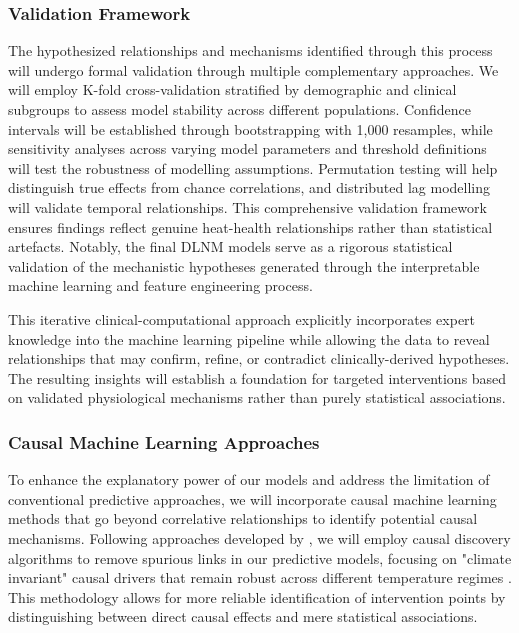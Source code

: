 \subsubsection{Validation Framework}
The hypothesized relationships and mechanisms identified through this process will undergo formal validation through multiple complementary approaches. We will employ K-fold cross-validation stratified by demographic and clinical subgroups to assess model stability across different populations. Confidence intervals will be established through bootstrapping with 1,000 resamples, while sensitivity analyses across varying model parameters and threshold definitions will test the robustness of modelling assumptions. Permutation testing will help distinguish true effects from chance correlations, and distributed lag modelling will validate temporal relationships. This comprehensive validation framework ensures findings reflect genuine heat-health relationships rather than statistical artefacts. Notably, the final DLNM models serve as a rigorous statistical validation of the mechanistic hypotheses generated through the interpretable machine learning and feature engineering process\citep{Gasparrini2015}.

This iterative clinical-computational approach explicitly incorporates expert knowledge into the machine learning pipeline while allowing the data to reveal relationships that may confirm, refine, or contradict clinically-derived hypotheses. The resulting insights will establish a foundation for targeted interventions based on validated physiological mechanisms rather than purely statistical associations.

\subsubsection{Causal Machine Learning Approaches}
To enhance the explanatory power of our models and address the limitation of conventional predictive approaches, we will incorporate causal machine learning methods that go beyond correlative relationships to identify potential causal mechanisms. Following approaches developed by \citet{Runge2019}, we will employ causal discovery algorithms to remove spurious links in our predictive models, focusing on "climate invariant" causal drivers that remain robust across different temperature regimes \citep{Beucler2021}. This methodology allows for more reliable identification of intervention points by distinguishing between direct causal effects and mere statistical associations.

